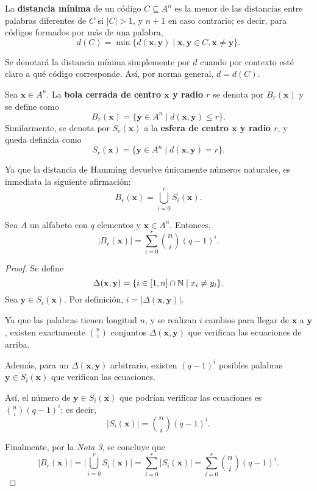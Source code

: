 \begin{definition}
	La \textbf{distancia mínima} de un código $C \subseteq A^n$ es la menor de las distancias entre palabras diferentes de $C$ si $|C| > 1$, y $n+1$ en caso contrario; es decir, para códigos formados por más de una palabra,
	\[d(C) = \min\{d(\textbf{x}, \textbf{y}) \mid \textbf{x}, \textbf{y} \in C, \textbf{x}\neq\textbf{y}\}.\]
	
	\begin{remark}
		Se denotará la distancia mínima simplemente por $d$ cuando por contexto esté claro a qué código corresponde. Así, por norma general, $d = d(C)$.
	\end{remark}
\end{definition}

\begin{definition}
	Sea $\textbf{x} \in A^n$. La \textbf{bola cerrada de centro $\textbf{x}$ y radio $r$} se denota por $B_r(\textbf{x})$ y se define como
	\[B_r(\textbf{x}) = \{\textbf{y} \in A^n \mid d(\textbf{x}, \textbf{y}) \leq r\}.\]
	Similarmente, se denota por $S_r(\textbf{x})$ a la \textbf{esfera de centro $\textbf{x}$ y radio $r$}, y queda definida como
	\[S_r(\textbf{x}) = \{\textbf{y} \in A^n \mid d(\textbf{x}, \textbf{y}) = r\}.\]
	\begin{remark}
		Ya que la distancia de Hamming devuelve únicamente números naturales, es inmediata la siguiente afirmación:
		\[B_r(\textbf{x}) = \bigcup_{i=0}^r S_i(\textbf{x}).\]
	\end{remark}
\end{definition}

\begin{theorem}
	Sea $A$ un alfabeto con $q$ elementos y $\textbf{x} \in A^n$. Entonces,
	\[|B_r(\textbf{x})| = \sum_{i=0}^r\binom{n}{i}(q - 1)^i.\]
\end{theorem}

\begin{proof}
	Se define
	\[\Delta(\textbf{x}, \textbf{y}) = \{i\in[1,n]\cap\mathbb{N} \mid x_i \neq y_i\}.\]
	Sea $\textbf{y} \in S_i(\textbf{x})$. Por definición, $i = |\Delta(\textbf{x}, \textbf{y})|$.
	
	Ya que las palabras tienen longitud $n$, y se realizan $i$ cambios para llegar de $\textbf{x}$ a $\textbf{y}$, existen exactamente $\binom{n}{i}$ conjuntos $\Delta(\textbf{x}, \textbf{y})$ que verifican las ecuaciones de arriba.
	
	Además, para un $\Delta(\textbf{x}, \textbf{y})$ arbitrario, existen $(q - 1)^i$ posibles palabras $\textbf{y} \in S_i(\textbf{x})$ que verifican las ecuaciones.
	
	Así, el número de $\textbf{y} \in S_i(\textbf{x})$ que podrían verificar las ecuaciones es $\binom{n}{i}(q - 1)^i$; es decir,
	\[|S_i(\textbf{x})| = \binom{n}{i}(q - 1)^i.\]
	
	Finalmente, por la \textit{Nota 3}, se concluye que
	\[|B_r(\textbf{x})| = \bigg|\bigcup_{i=0}^r S_i(\textbf{x})\bigg| = \sum_{i=0}^r |S_i(\textbf{x})| = \sum_{i=0}^r\binom{n}{i}(q - 1)^i.\]
\end{proof}

